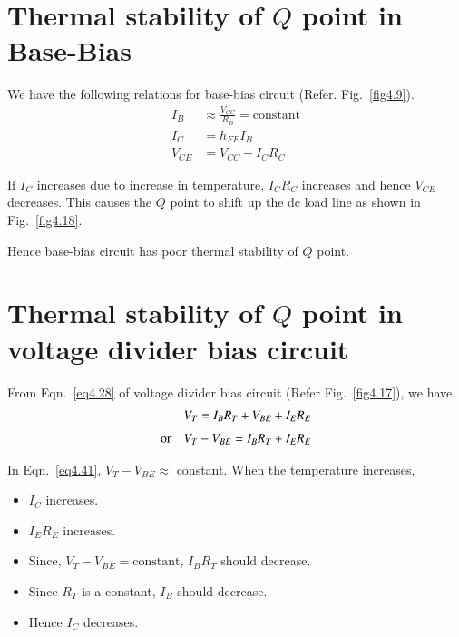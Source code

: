 \medskip

\section[Thermal stability of $Q$ point in Base-Bias]{Thermal stability of \boldmath$Q$ point in Base-Bias}\label{sec4.11}

We have the following relations for base-bias circuit (Refer. Fig.~\ref{fig4.9}).
\begin{align}
I_{B} &\approx \frac{V_{CC}}{R_{B}}=\text{constant}\label{eq4.38}\\[7pt]
I_{C} &= h_{FE}I_{B}\label{eq4.39}\\
V_{CE} &= V_{CC}-I_{C}R_{C}\label{eq4.40}
\end{align}

If $I_{C}$ increases due to increase in temperature, $I_{C}R_{C}$ increases and hence $V_{CE}$ decreases. This causes the $Q$ point to shift up the dc load line as shown in Fig.~\ref{fig4.18}.

Hence base-bias circuit has poor thermal stability of $Q$ point.

\section[Thermal stability of $Q$ point in voltage divider bias circuit]{Thermal stability of \boldmath$Q$ point in voltage divider bias circuit}

From Eqn.~\eqref{eq4.28} of voltage divider bias circuit (Refer Fig.~\ref{fig4.17}), we have
\begin{align}
& V_{T} = I_{B}R_{T}+V_{BE}+I_{E}R_{E}\notag\\[3pt]
\text{or}\quad & V_{T}-V_{BE}=I_{B}R_{T}+I_{E}R_{E}\label{eq4.41}
\end{align}

In Eqn.~\eqref{eq4.41}, $V_{T}-V_{BE}\approx$ constant. When the temperature increases,
\begin{itemize}
\item $I_{C}$ increases.

\item $I_{E}R_{E}$ increases.

\item Since, $V_{T}-V_{BE}=\text{constant}$, $I_{B}R_{T}$ should decrease.

\item Since $R_{T}$ is a constant, $I_{B}$ should decrease.

\item Hence $I_{C}$ decreases.
\end{itemize}

